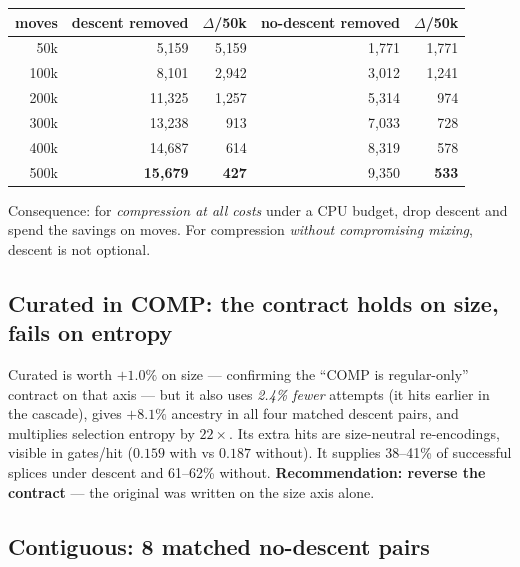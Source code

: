 \documentclass[11pt]{article}
\begin{document}
\begin{center}\small
\begin{tabular}{rrrrr}
\toprule
moves & descent removed & $\Delta$/50k & no-descent removed & $\Delta$/50k \\
\midrule
50k & 5{,}159 & 5{,}159 & 1{,}771 & 1{,}771 \\
100k & 8{,}101 & 2{,}942 & 3{,}012 & 1{,}241 \\
200k & 11{,}325 & 1{,}257 & 5{,}314 & 974 \\
300k & 13{,}238 & 913 & 7{,}033 & 728 \\
400k & 14{,}687 & 614 & 8{,}319 & 578 \\
500k & \textbf{15{,}679} & \textbf{427} & 9{,}350 & \textbf{533} \\
\bottomrule
\end{tabular}
\end{center}

Consequence: for \emph{compression at all costs} under a CPU budget, drop
descent and spend the savings on moves. For compression \emph{without
compromising mixing}, descent is not optional.

\subsection{Curated in COMP: the contract holds on size, fails on entropy}

Curated is worth $+1.0\%$ on size --- confirming the ``COMP is regular-only''
contract on that axis --- but it also uses \emph{2.4\% fewer} attempts (it
hits earlier in the cascade), gives $+8.1\%$ ancestry in all four matched
descent pairs, and multiplies selection entropy by $22\times$. Its extra hits
are size-neutral re-encodings, visible in gates/hit ($0.159$ with vs $0.187$
without). It supplies 38--41\% of successful splices under descent and
61--62\% without. \textbf{Recommendation: reverse the contract} --- the
original was written on the size axis alone.

\subsection{Contiguous: 8 matched no-descent pairs}
\end{document}
